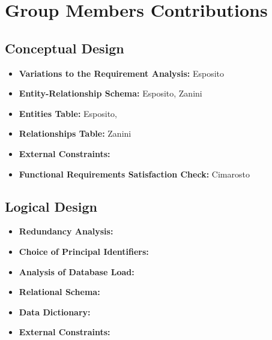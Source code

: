 \section{Group Members Contributions}


\subsection{Conceptual Design}
\begin{itemize}
	\item \textbf{Variations to the Requirement Analysis:} Esposito
	\item \textbf{Entity-Relationship Schema:} Esposito, Zanini 
	\item \textbf{Entities Table:} Esposito, 
	\item \textbf{Relationships Table:} Zanini
	\item \textbf{External Constraints:} 
	\item \textbf{Functional Requirements Satisfaction Check:} Cimarosto
\end{itemize}

\subsection{Logical Design}
\begin{itemize}
	\item \textbf{Redundancy Analysis:} 
	\item \textbf{Choice of Principal Identifiers:}
	\item \textbf{Analysis of Database Load:}
	\item \textbf{Relational Schema:}
	\item \textbf{Data Dictionary:}
	\item \textbf{External Constraints:}
\end{itemize}	